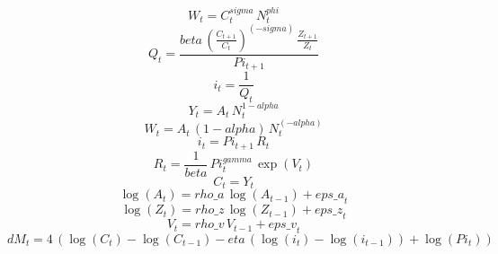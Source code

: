 \begin{dmath}
{W}_{t}={C}_{t}^{{sigma}}\, {N}_{t}^{{phi}}
\end{dmath}
\begin{dmath}
{Q}_{t}=\frac{{beta}\, \left(\frac{{C}_{t+1}}{{C}_{t}}\right)^{\left(-{sigma}\right)}\, \frac{{Z}_{t+1}}{{Z}_{t}}}{{Pi}_{t+1}}
\end{dmath}
\begin{dmath}
{i}_{t}=\frac{1}{{Q}_{t}}
\end{dmath}
\begin{dmath}
{Y}_{t}={A}_{t}\, {N}_{t}^{1-{alpha}}
\end{dmath}
\begin{dmath}
{W}_{t}={A}_{t}\, \left(1-{alpha}\right)\, {N}_{t}^{\left(-{alpha}\right)}
\end{dmath}
\begin{dmath}
{i}_{t}={Pi}_{t+1}\, {R}_{t}
\end{dmath}
\begin{dmath}
{R}_{t}=\frac{1}{{beta}}\, {Pi}_{t}^{{gamma}}\, \exp\left({V}_{t}\right)
\end{dmath}
\begin{dmath}
{C}_{t}={Y}_{t}
\end{dmath}
\begin{dmath}
\log\left({A}_{t}\right)={rho\_a}\, \log\left({A}_{t-1}\right)+{eps\_a}_{t}
\end{dmath}
\begin{dmath}
\log\left({Z}_{t}\right)={rho\_z}\, \log\left({Z}_{t-1}\right)+{eps\_z}_{t}
\end{dmath}
\begin{dmath}
{V}_{t}={rho\_v}\, {V}_{t-1}+{eps\_v}_{t}
\end{dmath}
\begin{dmath}
{dM}_{t}=4\, \left(\log\left({C}_{t}\right)-\log\left({C}_{t-1}\right)-{eta}\, \left(\log\left({i}_{t}\right)-\log\left({i}_{t-1}\right)\right)+\log\left({Pi}_{t}\right)\right)
\end{dmath}
